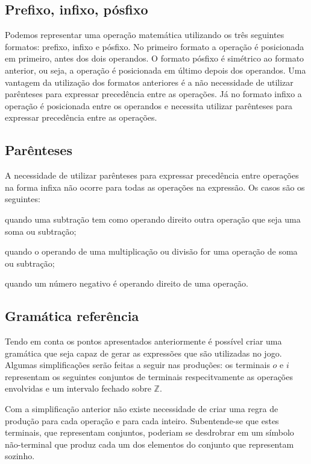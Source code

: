 \subsection{Prefixo, infixo, pósfixo}
Podemos representar uma operação matemática utilizando os três seguintes formatos: prefixo, infixo e pósfixo. No primeiro formato a operação é posicionada em primeiro, antes dos dois operandos. O formato pósfixo é simétrico ao formato anterior, ou seja, a operação é posicionada em último depois dos operandos. Uma vantagem da utilização dos formatos anteriores é a não necessidade de utilizar parênteses para expressar precedência entre as operações. Já no formato infixo a operação é posicionada entre os operandos e necessita utilizar parênteses para expressar precedência entre as operações.

\subsection{Parênteses}
A necessidade de utilizar parênteses para expressar precedência entre operações na forma infixa não ocorre para todas as operações na expressão. Os casos são os seguintes: 

\begin{alineas}
\item quando uma subtração tem como operando direito outra operação que seja uma soma ou subtração;
\item quando o operando de uma multiplicação ou divisão for uma operação de soma ou subtração;
\item quando um número negativo é operando direito de uma operação.
\end{alineas}

\subsection{Gramática referência}
Tendo em conta os pontos apresentados anteriormente é possível criar uma gramática que seja capaz de gerar as expressões que são utilizadas no jogo. Algumas simplificações serão feitas a seguir nas produções: os terminais $o$ e $i$ representam os seguintes conjuntos de terminais respecitvamente as operações envolvidas e um intervalo fechado sobre $\mathbb{Z}$.

	Com a simplificação anterior não existe necessidade de criar uma regra de produção para cada operação e para cada inteiro. Subentende-se que estes terminais, que representam conjuntos, poderiam se desdrobrar em um símbolo não-terminal que produz cada um dos elementos do conjunto que representam sozinho.
	
